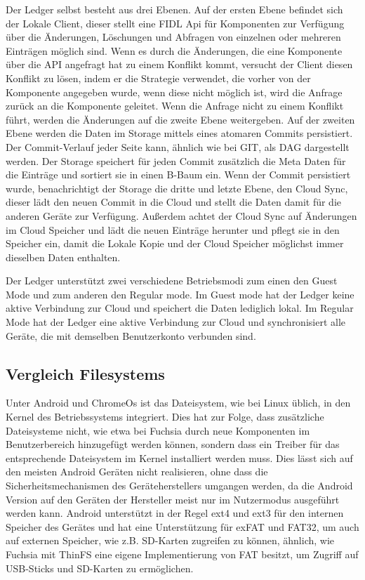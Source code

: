 \documentclass[a4paper]{scrartcl}
\begin{document}
Der Ledger selbst besteht aus drei Ebenen. Auf der ersten Ebene befindet sich der Lokale Client, dieser stellt eine FIDL Api für Komponenten zur Verfügung über die Änderungen, Löschungen und Abfragen von einzelnen oder mehreren Einträgen möglich sind. Wenn es durch die Änderungen, die eine Komponente über die API angefragt hat zu einem Konflikt kommt, versucht der Client diesen Konflikt zu lösen, indem er die Strategie verwendet, die vorher von der Komponente angegeben wurde, wenn diese nicht möglich ist, wird die Anfrage zurück an die Komponente geleitet. Wenn die Anfrage nicht zu einem Konflikt führt, werden die Änderungen auf die zweite Ebene weitergeben. Auf der zweiten Ebene werden die Daten im Storage mittels eines atomaren Commits persistiert. Der Commit-Verlauf jeder Seite kann, ähnlich wie bei GIT, als DAG dargestellt werden. Der Storage speichert für jeden Commit zusätzlich die Meta Daten für die Einträge und sortiert sie in einen B-Baum ein. Wenn der Commit persistiert wurde, benachrichtigt der Storage die dritte und letzte Ebene, den Cloud Sync, dieser lädt den neuen Commit in die Cloud und stellt die Daten damit für die anderen Geräte zur Verfügung. Außerdem achtet der Cloud Sync auf Änderungen im Cloud Speicher und lädt die neuen Einträge herunter und pflegt sie in den Speicher ein, damit die Lokale Kopie und der Cloud Speicher möglichst immer dieselben Daten enthalten. 

Der Ledger unterstützt zwei verschiedene Betriebsmodi zum einen den Guest Mode und zum anderen den Regular mode. Im Guest mode hat der Ledger keine aktive Verbindung zur Cloud und speichert die Daten lediglich lokal. Im Regular Mode hat der Ledger eine aktive Verbindung zur Cloud und synchronisiert alle Geräte, die mit demselben Benutzerkonto verbunden sind.
\subsection{Vergleich Filesystems}
\label{sec:vglFileSystems}
Unter Android und ChromeOs ist das Dateisystem, wie bei Linux üblich, in den Kernel des Betriebssystems integriert. Dies hat zur Folge, dass zusätzliche Dateisysteme nicht, wie etwa bei Fuchsia durch neue Komponenten im Benutzerbereich hinzugefügt werden können, sondern dass ein Treiber für das entsprechende Dateisystem im Kernel installiert werden muss. Dies lässt sich auf den meisten Android Geräten nicht realisieren, ohne dass die Sicherheitsmechanismen des Geräteherstellers umgangen werden, da die Android Version auf den Geräten der Hersteller meist nur im Nutzermodus ausgeführt werden kann. Android unterstützt in der Regel ext4 und ext3 für den internen Speicher des Gerätes und hat eine Unterstützung für exFAT und FAT32, um auch auf externen Speicher, wie z.B. SD-Karten zugreifen zu können, ähnlich, wie Fuchsia mit ThinFS eine eigene Implementierung von FAT besitzt, um Zugriff auf USB-Sticks und SD-Karten zu ermöglichen.
\end{document}
